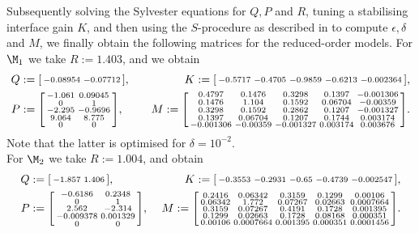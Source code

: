 \documentclass[letterpaper, 10 pt, conference]{amsart}
\theoremstyle{definition}
\theoremstyle{example}
\theoremstyle{remark}
\newcommand{\eps}{\epsilon}
\begin{document}
Subsequently solving the Sylvester equations for $Q,P$ and $R$,   
tuning a stabilising  interface gain $K$, 
and then using the $S$-procedure as described in \cite{Boyd2004} to compute $\eps, \delta$ and $M$, 
we finally obtain the following matrices for the reduced-order models.
For $\M_1$ we take $R:= 1.403$, and we obtain 
\begin{align*}
Q& :=\begin{bsmallmatrix}-0.08954 &-0.07712\end{bsmallmatrix} ,& \quad K:=\begin{bsmallmatrix}  -0.5717 & -0.4705 & -0.9859 & -0.6213 &-0.002364 \end{bsmallmatrix}, \\
P&:= \begin{bsmallmatrix}   -1.061 & 0.09045 \\ 
       0 &       1 \\ 
  -2.295 & -0.9696 \\ 
   9.064 &   8.775 \\ 
       0 &       0  \end{bsmallmatrix}, &\quad
M:=\begin{bsmallmatrix}   0.4797 &  0.1476 &  0.3298 &  0.1397 &-0.001306 \\ 
  0.1476 &   1.104 &  0.1592 & 0.06704 &-0.00359 \\ 
  0.3298 &  0.1592 &  0.2862 &  0.1207 &-0.001327 \\ 
  0.1397 & 0.06704 &  0.1207 &  0.1744 &0.003174 \\ 
-0.001306 &-0.00359 &-0.001327 &0.003174 &0.003676\end{bsmallmatrix}.
\end{align*} 
Note that the latter is optimised for $\delta=10^{-2}$.\\
\noindent For $\M_2$ we take $R:=   1.004$, and obtain  \begin{align*}
Q& :=\begin{bsmallmatrix}  -1.857 &   1.406 \end{bsmallmatrix},
&\quad  K:=\begin{bsmallmatrix} -0.3553 & -0.2931 &   -0.65 & -0.4739 &-0.002547 \end{bsmallmatrix}, \\
P&:= \begin{bsmallmatrix}  -0.6186 &  0.2348 \\ 
       0 &       1 \\ 
   2.562 &  -2.314 \\ 
-0.009378 &0.001329 \\ 
       0 &       0 \end{bsmallmatrix},& \
M:=\begin{bsmallmatrix}       0.2416 & 0.06342 &  0.3159 &  0.1299 & 0.00106 \\ 
 0.06342 &   1.772 & 0.07267 & 0.02663 &0.0007664 \\ 
  0.3159 & 0.07267 &  0.4191 &  0.1728 &0.001395 \\ 
  0.1299 & 0.02663 &  0.1728 & 0.08168 &0.000351 \\ 
 0.00106 &0.0007664 &0.001395 &0.000351 &0.0001456 \end{bsmallmatrix}.
\end{align*}
\end{document}
